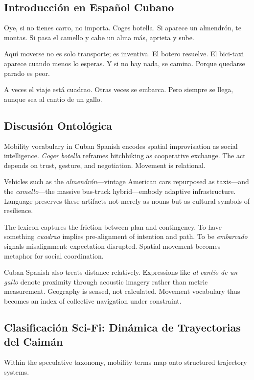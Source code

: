 \documentclass[12pt]{article}
\begin{document}
\subsection*{Introducción en Español Cubano}

Oye, si no tienes carro, no importa. Coges botella. Si aparece un almendrón, te montas. Si pasa el camello y cabe un alma más, aprieta y sube.

Aquí moverse no es solo transporte; es inventiva. El botero resuelve. El bici-taxi aparece cuando menos lo esperas. Y si no hay nada, se camina. Porque quedarse parado es peor.

A veces el viaje está cuadrao. Otras veces se embarca. Pero siempre se llega, aunque sea al cantío de un gallo.

\subsection*{Discusión Ontológica}

Mobility vocabulary in Cuban Spanish encodes spatial improvisation as social intelligence. \textit{Coger botella} reframes hitchhiking as cooperative exchange. The act depends on trust, gesture, and negotiation. Movement is relational.

Vehicles such as the \textit{almendrón}---vintage American cars repurposed as taxis---and the \textit{camello}---the massive bus-truck hybrid---embody adaptive infrastructure. Language preserves these artifacts not merely as nouns but as cultural symbols of resilience.

The lexicon captures the friction between plan and contingency. To have something \textit{cuadrao} implies pre-alignment of intention and path. To be \textit{embarcado} signals misalignment: expectation disrupted. Spatial movement becomes metaphor for social coordination.

Cuban Spanish also treats distance relatively. Expressions like \textit{al cantío de un gallo} denote proximity through acoustic imagery rather than metric measurement. Geography is sensed, not calculated. Movement vocabulary thus becomes an index of collective navigation under constraint.

\subsection*{Clasificación Sci-Fi: Dinámica de Trayectorias del Caimán}

Within the speculative taxonomy, mobility terms map onto structured trajectory systems.
\end{document}
